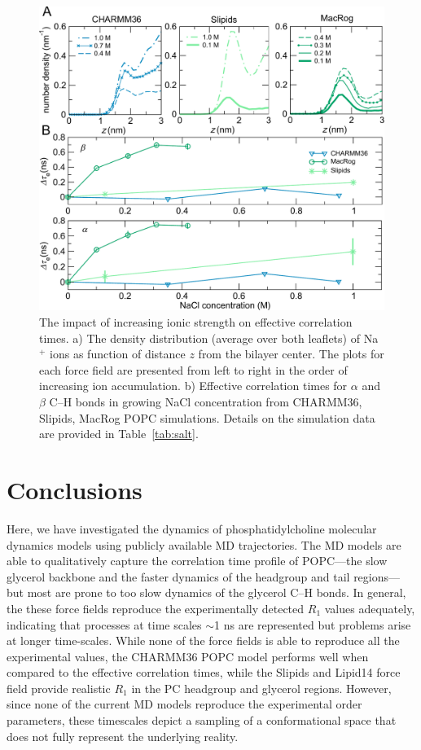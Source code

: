 \documentclass[journal=jpcbfk,manuscript=article,layout=twocolumn]{achemso}
\begin{document}
\begin{figure}[ht!]
\centering
\includegraphics[scale=0.36]{salt.pdf} 
\caption{The impact of increasing ionic strength on effective correlation times. a) The density distribution (average over both leaflets) of Na$^{+}$ ions as function of distance $z$ from the bilayer center. The plots for each force field are presented from left to right in the order of increasing ion accumulation. b) Effective correlation times for $\alpha$ and $\beta$ C--H bonds in growing NaCl concentration from CHARMM36, Slipids, MacRog POPC simulations. Details on the simulation data are provided in Table~\ref{tab:salt}.}
\label{fig:salt}
\end{figure}




\section{Conclusions}


Here, we have investigated the dynamics of phosphatidylcholine molecular dynamics models using publicly available MD trajectories. The MD models are able to qualitatively capture the correlation time profile of POPC---the slow glycerol backbone and the faster dynamics of the headgroup and tail regions---but most are prone to too slow dynamics of the glycerol C--H bonds.  In general, the these force fields reproduce the experimentally detected $R_{1}$ values adequately, indicating that processes at time scales $\sim$1 ns are represented but problems arise at longer time-scales. While none of the force fields is able to reproduce all the experimental values, the CHARMM36 POPC model performs well when compared to the effective correlation times, while the Slipids and Lipid14 force field provide realistic $R_{1}$ in the PC headgroup and glycerol regions. However, since none of the current MD models reproduce the experimental order parameters, these timescales depict a sampling of a conformational space that does not fully represent the underlying reality.
\end{document}
